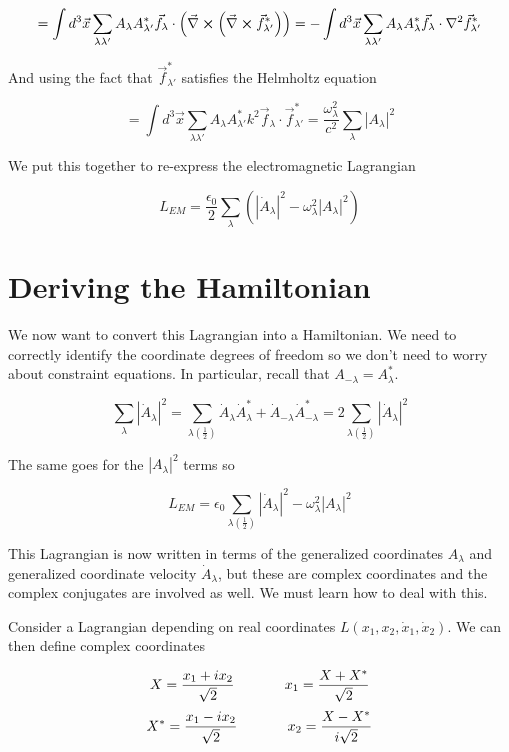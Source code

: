 \documentclass[12pt]{article}
\newcommand{\vecnab}{\vec{\nabla}}
\begin{document}
\[ = \int d^3\vec{x} \sum_{\lambda \lambda'} A_{\lambda} A_{\lambda'}^* \vec{f}_{\lambda} \cdot \left(\vecnab \cross \left(\vecnab \cross \vec{f}_{\lambda'}^*\right)\right) = 
-\int d^3 \vec{x} \sum_{\lambda \lambda'} A_{\lambda} A_{\lambda}^* \vec{f}_{\lambda} \cdot \nabla^2 \vec{f}_{\lambda'}^* \]

And using the fact that $\vec{f}_{\lambda'}^*$ satisfies the Helmholtz equation

\[ = \int d^3 \vec{x} \sum_{\lambda \lambda'} A_{\lambda} A_{\lambda'}^* k^2 \vec{f}_{\lambda} \cdot \vec{f}_{\lambda'}^* = \frac{\omega_{\lambda}^2}{c^2} \sum_{\lambda} |A_{\lambda}|^2 \]

We put this together to re-express the electromagnetic Lagrangian

\[L_{EM} = \frac{\epsilon_0}{2} \sum_{\lambda} \left(|\dot{A}_{\lambda}|^2 - \omega_{\lambda}^2 |A_{\lambda}|^2\right) \]


\section{Deriving the Hamiltonian}
We now want to convert this Lagrangian into a Hamiltonian.
We need to correctly identify the coordinate degrees of freedom so we don't need to worry about constraint equations.
In particular, recall that $A_{-\lambda} = A_{\lambda}^*$.

\[\sum_{\lambda} |\dot{A}_{\lambda}|^2 = \sum_{\lambda \left(\frac{1}{2}\right)} \dot{A}_{\lambda} \dot{A}_{\lambda}^* + \dot{A}_{-\lambda} \dot{A}_{-\lambda}^* = 2\sum_{\lambda \left(\frac{1}{2}\right)} |\dot{A}_{\lambda}|^2 \]

The same goes for the $|A_{\lambda}|^2$ terms so

\[L_{EM} = \epsilon_0 \sum_{\lambda \left(\frac{1}{2}\right)} |\dot{A}_{\lambda}|^2 -\omega_{\lambda}^2|A_{\lambda}|^2 \]

This Lagrangian is now written in terms of the generalized coordinates $A_{\lambda}$ and generalized coordinate velocity $\dot{A}_{\lambda}$, but these are complex coordinates and the complex conjugates are involved as well.
We must learn how to deal with this.

Consider a Lagrangian depending on real coordinates $L(x_1,x_2,\dot{x}_1,\dot{x}_2)$. We can then define complex coordinates

\[X = \frac{x_1+ix_2}{\sqrt{2}} \hspace{.5 in} x_1 = \frac{X+X^*}{\sqrt{2}} \]
\[X^* = \frac{x_1-ix_2}{\sqrt{2}} \hspace{.5 in} x_2 = \frac{X-X^*}{i\sqrt{2}} \]
\end{document}
